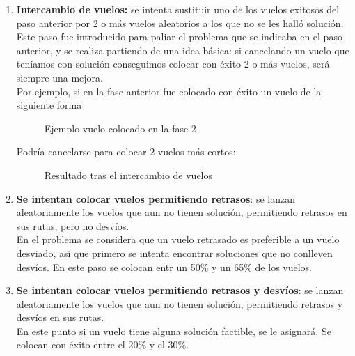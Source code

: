 \begin{enumerate}
	\item \textbf{Intercambio de vuelos: } se intenta sustituir uno de los vuelos exitosos del paso anterior por 2 o más vuelos aleatorios a los que no se les halló solución.\\
	Este paso fue introducido para paliar el problema que se indicaba en el paso anterior, y se realiza partiendo de una idea básica: si cancelando un vuelo que teníamos con solución conseguimos colocar con éxito 2 o más vuelos, será siempre una mejora.\\
	
	Por ejemplo, si en la fase anterior fue colocado con éxito un vuelo de la siguiente forma
	\begin{figure}[H]
		\centering
		
		\caption{Ejemplo vuelo colocado en la fase 2}
		\label{fig: Ejemplo vuelo colocado en la fase 2}
	\end{figure}
	
	Podría cancelarse para colocar 2 vuelos más cortos:
	\begin{figure}[H]
		\centering
		\begin{minipage}[H]{0.4\textwidth}
			
		\end{minipage}
		\hfill
		\begin{minipage}[H]{0.4\textwidth}
			
		\end{minipage}
		\caption{Resultado tras el intercambio de vuelos}
		\label{Fig: Resultado tras el intercambio de vuelos}
	\end{figure}
	
	\item \textbf{Se intentan colocar vuelos permitiendo retrasos}: se lanzan aleatoriamente los vuelos que aun no tienen solución, permitiendo retrasos en sus rutas, pero no desvíos.\\
	En el problema se considera que un vuelo retrasado es preferible a un vuelo desviado, así que primero se intenta encontrar soluciones que no conlleven desvíos. En este paso se colocan entr un 50\% y un 65\% de los vuelos.
	
	\item \textbf{Se intentan colocar vuelos permitiendo retrasos y desvíos}: se lanzan aleatoriamente los vuelos que aun no tienen solución, permitiendo retrasos y desvíos en sus rutas.\\
	En este punto si un vuelo tiene alguna solución factible, se le asignará. Se colocan con éxito entre el 20\% y el 30\%.
	

\end{enumerate}
